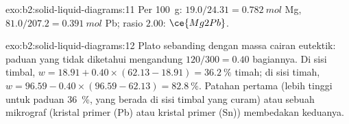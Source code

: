 \begin{solution}{exo:b2:solid-liquid-diagrams:11}
Per \qty{100}{g}: $19.0/24.31 = \qty{0.782}{mol}$ Mg, $81.0/207.2 =
\qty{0.391}{mol}$ Pb; rasio $2.00$: $\ce{Mg2Pb}$.
\end{solution}

\begin{solution}{exo:b2:solid-liquid-diagrams:12}
Plato sebanding dengan massa cairan eutektik: paduan yang tidak diketahui
mengandung $120/300 = 0.40$ bagiannya. Di sisi timbal,
$w = 18.91 + 0.40 \times (62.13 -
18.91) = 36.2~\%$ timah; di sisi timah,
$w = 96.59 - 0.40 \times (96.59 - 62.13) =
82.8~\%$. Patahan pertama  (lebih tinggi untuk paduan 36~\%, yang  berada di
sisi timbal yang curam) atau sebuah mikrograf (kristal primer (Pb) atau
kristal primer (Sn)) membedakan keduanya.
\end{solution}

